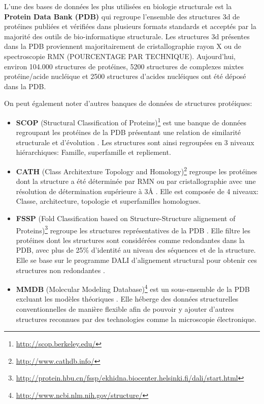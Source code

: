 L'une des bases de données les plus utilisées en biologie structurale est la \textbf{Protein Data Bank (PDB)} \cite{berman_protein_2000} qui regroupe l'ensemble des structures 3d de protéines publiées et vérifiées dans plusieurs formats standards et acceptés par la majorité des outils de bio-informatique structurale. Les structures 3d présentes dans la PDB proviennent majoritairement de cristallographie rayon X ou de spectroscopie RMN (POURCENTAGE PAR TECHNIQUE). Aujourd'hui, environ 104.000 structures de protéines, 5200 structures de complexes mixtes protéine/acide nucléique et 2500 structures d'acides nucléiques ont été déposé dans la PDB.

On peut également noter d'autres banques de données de structures protéiques:
\begin{itemize}
	\item \textbf{SCOP} (Structural Classification of Proteins)\footnote{\url{http://scop.berkeley.edu/}} est une banque de données regroupant les protéines de la PDB présentant une relation de similarité structurale et d'évolution \cite{murzin1995scop}. Les structures sont ainsi regroupées en 3 niveaux hiérarchiques: Famille, superfamille et repliement.
	\item \textbf{CATH} (Class Architexture Topology and Homology)\footnote{\url{http://www.cathdb.info/}} regroupe les protéines dont la structure a été déterminée par RMN ou par cristallographie avec une résolution de détermination supérieure à 3\r{A} \cite{sillitoe2015cath}. Elle est composée de 4 niveaux: Classe, architecture, topologie et superfamilles homologues.
	\item \textbf{FSSP} (Fold Classification based on Structure-Structure alignement of Proteins)\footnote{\url{http://protein.hbu.cn/fssp/ekhidna.biocenter.helsinki.fi/dali/start.html}} regroupe les structures représentatives de la PDB \cite{holm1996mapping}. Elle filtre les protéines dont les structures sont considérées comme redondantes dans la PDB, avec plus de 25\% d'identité au niveau des séquences et de la structure. Elle se base sur le programme DALI d'alignement structural pour obtenir ces structures non redondantes \cite{holm1998touring}.
	\item \textbf{MMDB} (Molecular Modeling Database)\footnote{\url{http://www.ncbi.nlm.nih.gov/structure/}} est un sous-ensemble de la PDB excluant les modèles théoriques \cite{madej2014mmdb}. Elle héberge des données structurelles conventionnelles de manière flexible afin de pouvoir y ajouter d'autres structures reconnues par des technologies comme la microscopie électronique.
\end{itemize}

